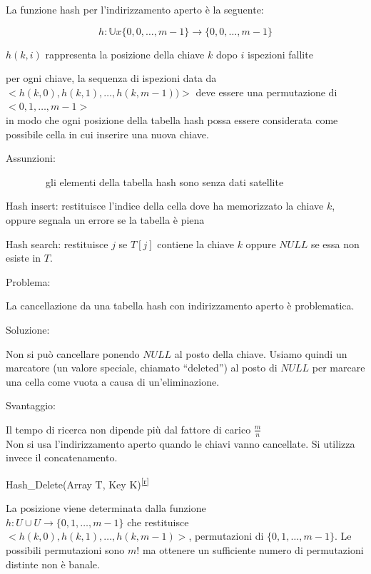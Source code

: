 \documentclass[11pt,a4paper,twoside,openright]{book}
\begin{document}
{La funzione hash per l'indirizzamento aperto è la seguente:}

\begin{equation}
h:\mathbb{U}x\{0,0,\ldots,m-1\} \rightarrow \{0,0,\ldots,m-1\}
\end{equation}

{$h(k,i)$ rappresenta la posizione della chiave $k$ dopo $i$ ispezioni fallite}

{per ogni chiave, la sequenza di ispezioni data da \\
$<h(k,0),h(k,1),\ldots,h(k,m-1))>$ deve essere una permutazione di $<0,1,\ldots,m-1>$ \\ in modo che ogni posizione della tabella hash possa essere considerata come possibile cella in cui inserire una nuova chiave.}

{Assunzioni:}

{~~~~~~~~gli elementi della tabella hash sono senza dati satellite}

{Hash insert: restituisce l'indice della cella dove ha memorizzato la chiave $k$, oppure segnala un errore se la tabella è piena}



{Hash search: restituisce $j$ se $T[j]$ contiene la chiave $k$ oppure $NULL$ se essa non esiste in $T$.}



{Problema:}

{La cancellazione da una tabella hash con indirizzamento aperto è problematica. }

{Soluzione:}

{Non si può cancellare ponendo $NULL$ al posto della chiave. Usiamo quindi un marcatore (un valore speciale, chiamato ``deleted'') al posto di $NULL$ per marcare una cella come vuota a causa di un'eliminazione.}

{Svantaggio:}

{Il tempo di ricerca non dipende più dal fattore di carico $\frac{m}{n}$}\\
{Non si usa l'indirizzamento aperto quando le chiavi vanno cancellate.
Si utilizza invece il concatenamento.}

{Hash\_Delete(Array T, Key
K)}\textsuperscript{\protect\hyperlink{cmnt18}{{[}r{]}}}

{La posizione viene determinata dalla funzione \\ $h:U\cup U\rightarrow \{0,1,\ldots,m-1\}$ che restituisce \\ $<h(k,0),h(k,1),\ldots,h(k,m-1)>$, permutazioni di $\{0,1,\ldots,m-1\}$. Le possibili permutazioni sono $m!$ ma ottenere un sufficiente numero di permutazioni distinte non è banale.}
\end{document}
